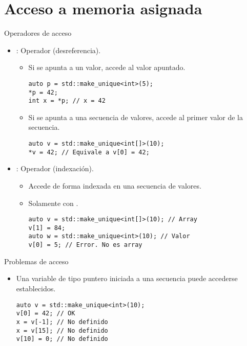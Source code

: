 \section{Acceso a memoria asignada}

\begin{frame}[t,fragile]{Operadores de acceso}
\begin{itemize}
  \item {}: Operador \cppkey{*} (desreferencia).
    \begin{itemize}
      \item Si se apunta a un valor, accede al valor apuntado.
\begin{lstlisting}
auto p = std::make_unique<int>(5);
*p = 42;
int x = *p; // x = 42
\end{lstlisting}

      \item Si se apunta a una secuencia de valores, accede al primer valor de la secuencia.
\begin{lstlisting}
auto v = std::make_unique<int[]>(10);
*v = 42; // Equivale a v[0] = 42;
\end{lstlisting}
    \end{itemize}

  \item {}: Operador \cppkey{[]} (indexación).
    \begin{itemize}
      \item Accede de forma indexada en una secuencia de valores.
      \item Solamente con .
\begin{lstlisting}
auto v = std::make_unique<int[]>(10); // Array
v[1] = 84;
auto w = std::make_unique<int>(10); // Valor
v[0] = 5; // Error. No es array
\end{lstlisting}
    \end{itemize}

\end{itemize}
\end{frame}

\begin{frame}[t,fragile]{Problemas de acceso}
\begin{itemize}
  \item Una variable de tipo puntero iniciada a una secuencia 
         puede accederse 
         establecidos.
\begin{lstlisting}
auto v = std::make_unique<int>(10);
v[0] = 42; // OK
x = v[-1]; // No definido
x = v[15]; // No definido
v[10] = 0; // No definido
\end{lstlisting}
\end{itemize}
\end{frame}

